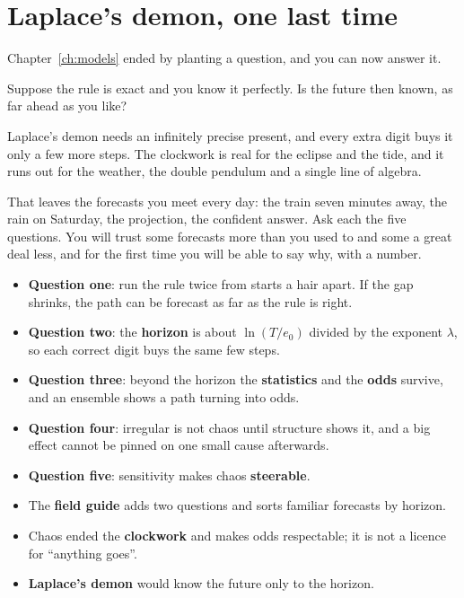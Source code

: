 \section{Laplace's demon, one last time}
\label{sec:ch18-demon}

\noindent
Chapter~\ref{ch:models} ended by planting a question, and you can now answer
it.

\begin{think}
Suppose the rule is exact and you know it perfectly. Is the future then
known, as far ahead as you like?
\end{think}
Laplace's demon needs an infinitely precise present, and every extra digit
buys it only a few more steps. The clockwork is real for the eclipse and the
tide, and it runs out for the weather, the double pendulum and a single line
of algebra.

That leaves the forecasts you meet every day: the train seven minutes away,
the rain on Saturday, the projection, the confident answer. Ask each the
five questions. You will trust some forecasts more than you used to and some
a great deal less, and for the first time you will be able to say why, with
a number.

\begin{summarybox}
\begin{itemize}
\item \textbf{Question one}: run the rule twice from starts a hair apart. If
  the gap shrinks, the path can be forecast as far as the rule is right.
\item \textbf{Question two}: the \textbf{horizon} is about $\ln(T/e_0)$
  divided by the exponent $\lambda$, so each correct digit buys the same few
  steps.
\item \textbf{Question three}: beyond the horizon the \textbf{statistics}
  and the \textbf{odds} survive, and an ensemble shows a path turning into
  odds.
\item \textbf{Question four}: irregular is not chaos until structure shows
  it, and a big effect cannot be pinned on one small cause afterwards.
\item \textbf{Question five}: sensitivity makes chaos \textbf{steerable}.
\item The \textbf{field guide} adds two questions and sorts familiar
  forecasts by horizon.
\item Chaos ended the \textbf{clockwork} and makes odds respectable; it is
  not a licence for \enquote{anything goes}.
\item \textbf{Laplace's demon} would know the future only to the horizon.
\end{itemize}
\end{summarybox}

